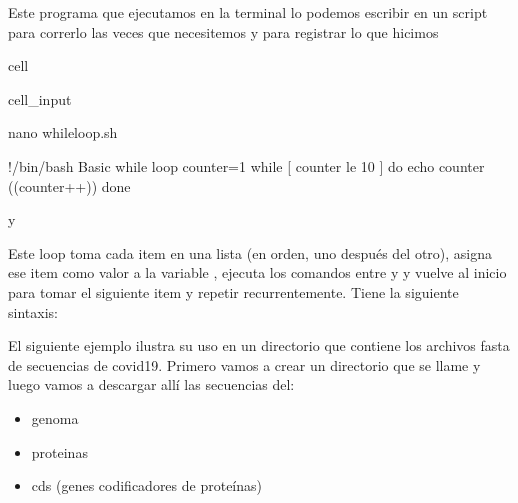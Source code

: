 \documentclass[letterpaper,10pt,english]{jupyterBook}
\begin{document}
\sphinxAtStartPar
Este programa que ejecutamos en la terminal lo podemos escribir en un script para correrlo las veces que necesitemos y para registrar lo que hicimos

\begin{sphinxuseclass}{cell}\begin{sphinxVerbatimInput}

\begin{sphinxuseclass}{cell_input}
\begin{sphinxVerbatim}[commandchars=\\\{\}]
\PYGZdl{} nano while\PYGZus{}loop.sh

\PYGZsh{}!/bin/bash
\PYGZsh{} Basic while loop
counter=1
while [ \PYGZdl{}counter \PYGZhy{}le 10 ]
do
echo \PYGZdl{}counter
((counter++))
done
\end{sphinxVerbatim}

\end{sphinxuseclass}\end{sphinxVerbatimInput}

\end{sphinxuseclass}
\sphinxAtStartPar
{} y 



\begin{DUlineblock}{0em}
\item[] 
\end{DUlineblock}

\sphinxAtStartPar
Este loop toma cada item en una lista (en orden, uno después del otro), asigna ese item como valor a la variable , ejecuta los comandos entre  y  y vuelve al inicio para tomar el siguiente item y repetir recurrentemente.  Tiene la siguiente sintaxis:

\sphinxAtStartPar
{}

\sphinxAtStartPar
{}

\sphinxAtStartPar
{}

\sphinxAtStartPar
{}

\sphinxAtStartPar
El siguiente ejemplo ilustra su uso en un directorio que contiene los archivos fasta de secuencias de covid19. Primero vamos a crear un directorio que se llame  y luego vamos a descargar allí las secuencias del:
\begin{itemize}
\item {} 
\sphinxAtStartPar
genoma

\item {} 
\sphinxAtStartPar
proteinas

\item {} 
\sphinxAtStartPar
cds (genes codificadores de proteínas)

\end{itemize}
\end{document}
